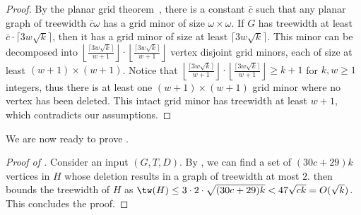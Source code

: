 \begin{proof}
By the planar grid theorem~\cite{RobertsonST94}, there is a constant $\bar c$ such that any planar graph of treewidth $\bar c \omega$ has a grid minor of size $\omega \times \omega$. If $G$ has treewidth at least $\bar c \cdot \lceil 3w\sqrt{k}\rceil$, then it has a grid minor of size at least $\lceil 3w\sqrt{k}\rceil$. This minor can be decomposed into $\left\lfloor \frac{ \lceil 3w\sqrt{k}\rceil}{w+1}\right\rfloor \cdot \left\lfloor \frac{ \lceil 3w\sqrt{k}\rceil}{w+1}\right\rfloor$ vertex disjoint grid minors, each of size at least $(w+1)\times(w+1)$. Notice that $\left\lfloor \frac{ \lceil 3w\sqrt{k}\rceil}{w+1}\right\rfloor \cdot \left\lfloor \frac{ \lceil 3w\sqrt{k}\rceil}{w+1}\right\rfloor\geq k+1$ for $k,w\geq 1$ integers, thus there is at least one $(w+1)\times(w+1)$ grid minor where no vertex has been deleted. This intact grid minor has treewidth at least $w+1$, which contradicts our assumptions.
\end{proof}

We are now ready to prove .

\begin{proof}[Proof of ]
Consider an input $(G,T,D)$. By , we can find a set of $(30c+29)k$ vertices in $H$ whose deletion results in a graph of treewidth at most $2$.  then bounds the treewidth of $H$ as $\tw(H)\leq 3\cdot 2 \cdot \sqrt{(30c+29)k}< 47\sqrt{ck}=O(\sqrt{k})$.
This concludes the proof.
\end{proof}